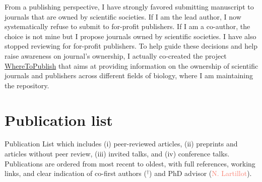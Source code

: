 \documentclass[11pt,a4paper]{moderncv}
\begin{document}
From a publishing perspective, I have strongly favored submitting manuscript to journals that are owned by scientific societies.
If I am the lead author, I now systematically refuse to submit to for-profit publishers.
If I am a co-author, the choice is not mine but I propose journals owned by scientific societies.
I have also stopped reviewing for for-profit publishers.
To help guide these decisions and help raise awareness on journal's ownership, I actually co-created the project \href{https://wheretopublish.github.io/}{WhereToPublish} that aims at providing information on the ownership of scientific journals and publishers across different fields of biology, where I am maintaining the repository.

\newpage
\section{Publication list}
Publication List which includes (i) peer-reviewed articles, (ii) preprints and articles without peer review, (iii) invited talks, and (iv) conference talks.
Publications are ordered from most recent to oldest, with full references, working links, and clear indication of co-first authors ($^\dag$) and PhD advisor (\textcolor{Salmon}{N. Lartillot}).
\end{document}
